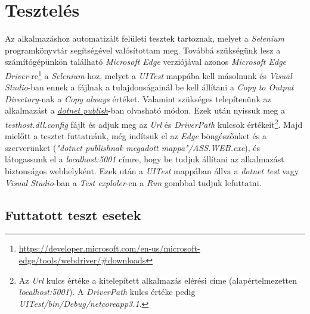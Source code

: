 \chapter{Tesztelés} %
\label{ch:test}
Az alkalmazáshoz automatizált felületi tesztek tartoznak, melyet a \emph{Selenium} \cite{Selenium} programkönyvtár segítségével valósítottam meg. Továbbá szükségünk lesz a számítógépünkön található \emph{Microsoft Edge} verziójával azonos \emph{Microsoft Edge Driver}-re\footnote{\url{https://developer.microsoft.com/en-us/microsoft-edge/tools/webdriver/\#downloads}} a \emph{Selenium}-hoz, melyet a \emph{UITest} mappába kell másolnunk és \emph{Visual Studio}-ban ennek a fájlnak a tulajdonságainál be kell állítani a \emph{Copy to Output Directory}-nak a \emph{Copy always} értéket. Valamint szükséges telepítenünk az alkalmazást a \hyperref[step:dotnet-publish]{\emph{dotnet publish}}-ban olvasható módon. Ezek után nyissuk meg a \emph{testhost.dll.config} fájlt és adjuk meg az \emph{Url} és \emph{DriverPath} kulcsok értékeit\footnote{Az \emph{Url} kulcs értéke a kitelepített alkalmazás elérési címe (alapértelmezetten \emph{localhost:5001}). A \emph{DriverPath} kulcs értéke pedig \emph{UITest/bin/Debug/netcoreapp3.1}.}. Majd mielőtt a tesztet futtatnánk, még indítsuk el az \emph{Edge} böngészőnket és a szerverünket (\emph{"dotnet publishnak megadott mappa"/ASS.WEB.exe}), és látogassunk el a \emph{localhost:5001} címre, hogy be tudjuk állítani az alkalmazást biztonságos webhelyként. Ezek után a \emph{UITest} mappában állva a \emph{dotnet test} vagy \emph{Visual Studio}-ban a \emph{Test exploler}-en a \emph{Run} gombbal tudjuk lefuttatni.
\section{Futtatott teszt esetek}
